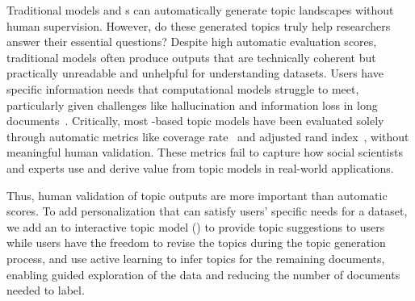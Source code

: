Traditional models and \mm{}s can automatically generate
topic landscapes without human supervision.
%
However, do these generated topics truly help researchers answer their
essential questions?
%
Despite high automatic evaluation scores, traditional models often
produce outputs that are technically coherent but practically
unreadable and unhelpful for understanding
datasets.
%
Users have specific information needs that computational models
struggle to meet, particularly given challenges like hallucination and
information loss in long
documents~\cite{liu2023lostmiddlelanguagemodels}.
%
Critically, most \mm{}-based topic models have been evaluated solely
through automatic metrics like coverage rate~\cite{lam2024concept} and
adjusted rand index~\cite{ARI}, without meaningful human validation.
%
These metrics fail to capture how social scientists and experts use
and derive value from topic models in real-world applications.


Thus, human validation of topic outputs are more important than automatic scores.
%
To add personalization that can satisfy users'
specific needs for a dataset, we add an \mm{} to interactive topic model (\bass{}) to provide topic suggestions to users while users
have the freedom to revise the topics during the topic generation
process, and use active learning to infer topics for the remaining
documents, enabling guided exploration of the data and reducing the
number of documents needed to label.



